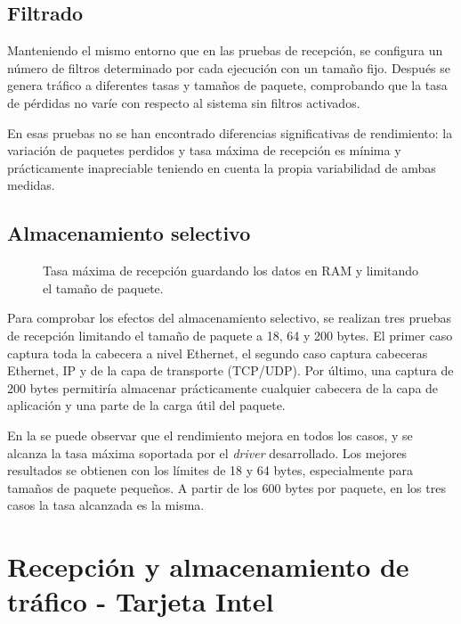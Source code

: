 \documentclass[twoside, 12pt, draft]{epstfg}
\begin{document}
\subsection{Filtrado}

Manteniendo el mismo entorno que en las pruebas de recepción, se configura un número de filtros determinado por cada ejecución con un tamaño fijo. Después se genera tráfico a diferentes tasas y tamaños de paquete, comprobando que la tasa de pérdidas no varíe con respecto al sistema sin filtros activados.

En esas pruebas no se han encontrado diferencias significativas de rendimiento: la variación de paquetes perdidos y tasa máxima de recepción es mínima y prácticamente inapreciable teniendo en cuenta la propia variabilidad de ambas medidas.

\subsection{Almacenamiento selectivo}

\begin{figure}[hbtp]
\caption[Tasa máxima experimental limitando el tamaño de paquete]{Tasa máxima de recepción guardando los datos en RAM y limitando el tamaño de paquete.}
\label{fig:Validacion:CaplenEffects}
\end{figure}

Para comprobar los efectos del almacenamiento selectivo, se realizan tres pruebas de recepción limitando el tamaño de paquete a 18, 64 y 200 bytes. El primer caso captura toda la cabecera a nivel Ethernet, el segundo caso captura cabeceras Ethernet, IP y de la capa de transporte (TCP/UDP). Por último, una captura de 200 bytes permitiría almacenar prácticamente cualquier cabecera de la capa de aplicación y una parte de la carga útil del paquete.

En la  se puede observar que el rendimiento mejora en todos los casos, y se alcanza la tasa máxima soportada por el \textit{driver} desarrollado. Los mejores resultados se obtienen con los límites de 18 y 64 bytes, especialmente para tamaños de paquete pequeños. A partir de los 600 bytes por paquete, en los tres casos la tasa alcanzada es la misma.

\section{Recepción y almacenamiento de tráfico - Tarjeta Intel}
\end{document}
